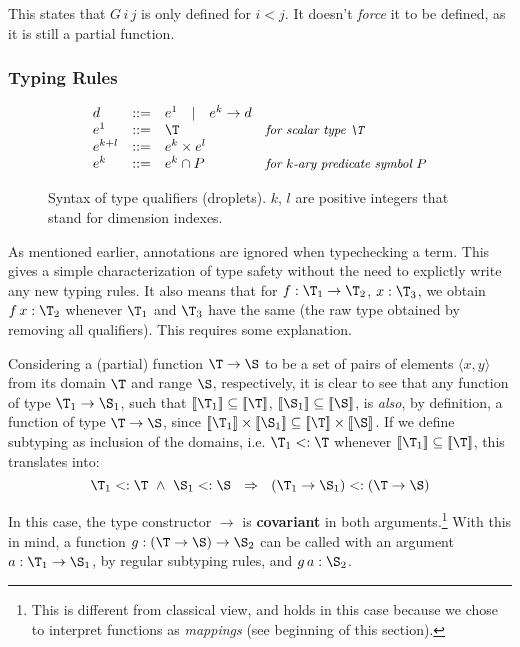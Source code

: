 This states that $G\,i\,j$ is only defined for $i<j$. It doesn't {\em force} it to be defined,
as it is still a partial function.
\fi

\subsubsection{Typing Rules}

\begin{figure}
\[
\begin{array}{lcll}
  d       & ::= & e^1 \quad |\quad e^k\to d \\
  e^1     & ::= & \T & \mbox{\it\small for scalar type $\T$} \\
  e^{k+l} & ::= & e^k \times e^l \\
  e^k     & ::= & e^k \cap P & \mbox{\it\small for $k$-ary predicate symbol $P$} 
\end{array}
\]
\vspace{-.5em}
\caption{\label{lang:droplets}
  Syntax of type qualifiers (droplets). $k$, $l$ are positive integers
  that stand for dimension indexes.}
\end{figure}

As mentioned earlier, annotations are ignored when typechecking a term.
This gives a simple characterization of type safety without the need to
explictly write any new typing rules. It also means that for $f:\T_1\to\T_2$, $x:\T_3$, we obtain $f\,x:\T_2$ whenever
$\T_1$ and $\T_3$ have the same  \cbstart(the raw type obtained by removing all qualifiers)\cbend.
This requires some explanation.

Considering a (partial) function $\T\to\S$ to be a set of pairs of elements $\langle x,y\rangle$ 
from its domain $\T$ and range $\S$, respectively, it is clear to see that any function of type $\T_1\to\S_1$,
such that $\semp{\T_1}\subseteq\semp{\T}$, $\semp{\S_1}\subseteq\semp{\S}$, 
is \emph{also}, by definition, a function of type $\T\to\S$, since $\semp{\T_1}\times\semp{\S_1}\subseteq\semp{\T}\times\semp{\S}$.
If we define subtyping as inclusion of the domains, i.e. $\T_1 <:\T$ whenever $\semp{\T_1}\subseteq\semp{\T}$,
this translates into:
%
\[\T_1<:\T ~\land~ \S_1<:\S ~~\Rightarrow~~ (\T_1\to\S_1) <: (\T\to\S)\]

In this case, the type constructor $\to$ is {\bf covariant} in both arguments.\footnote{This is different from classical view, and holds in this case because we chose to interpret functions as \emph{mappings} (see beginning of this section).}
With this in mind, a function $g:(\T\to\S)\to \S_2$ can be called with an argument $a: \T_1\to\S_1$,
by regular subtyping rules, and $g\,a : \S_2$.

